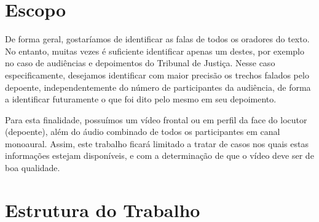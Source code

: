 \section{Escopo}

De forma geral, gostaríamos de identificar as falas de todos os oradores do texto. No entanto, muitas vezes é suficiente identificar apenas um destes, por exemplo no caso de audiências e depoimentos do Tribunal de Justiça. Nesse caso especificamente, desejamos identificar com maior precisão os trechos falados pelo depoente, independentemente do número de participantes da audiência, de forma a identificar futuramente o que foi dito pelo mesmo em seu depoimento.

Para esta finalidade, possuímos um vídeo frontal ou em perfil da face do locutor (depoente), além do áudio combinado de todos os participantes em canal monoaural. Assim, este trabalho ficará limitado a tratar de casos nos quais estas informações estejam disponíveis, e com a determinação de que o vídeo deve ser de boa qualidade.

\section{Estrutura do Trabalho}